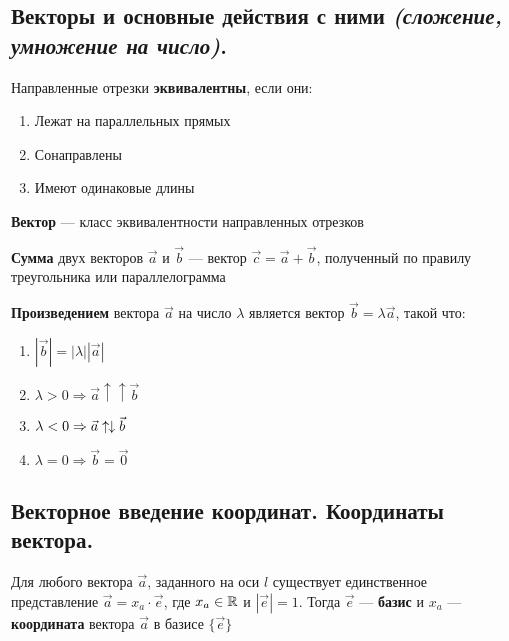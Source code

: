 \subsection{Векторы и основные действия с ними \textit{(сложение, умножение на число)}.}
\begin{definition}
    Направленные отрезки \textbf{эквивалентны}, если они:
    \begin{enumerate}
        \item Лежат на параллельных прямых
        \item Сонаправлены
        \item Имеют одинаковые длины
    \end{enumerate}
\end{definition}
\begin{definition}
    \textbf{Вектор} --- класс эквивалентности направленных отрезков
\end{definition}
\begin{definition}
    \textbf{Сумма} двух векторов $\vec a$ и $\vec b$ --- вектор $\vec c=\vec a + \vec b$, полученный по правилу треугольника или параллелограмма
\end{definition}
\begin{definition}
    \textbf{Произведением} вектора $\vec a$ на число $\lambda$ является вектор $\vec b=\lambda\vec a$, такой что:
    \begin{enumerate}
        \item $|\vec b|=|\lambda||\vec a|$
        \item $\lambda>0\Rightarrow \vec a\uparrow\uparrow\vec b$
        \item $\lambda<0\Rightarrow \vec a\uparrow\mathrel{\mspace{-1mu}}\downarrow\vec b$
        \item $\lambda=0\Rightarrow \vec b=\vec 0$
    \end{enumerate}
\end{definition}

\subsection{Векторное введение координат. Координаты вектора.}
Для любого вектора $\vec a$, заданного на оси $l$ существует единственное представление $\vec a = x_a \cdot \vec e$, где $x_a \in \mathbb{R}$ и $|\vec e| = 1$. Тогда $\vec e$ --- \textbf{базис} и $x_a$ --- \textbf{координата} вектора $\vec a$ в базисе $\{\vec e\}$

